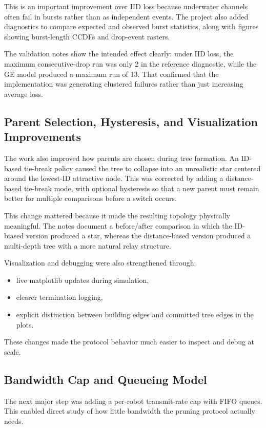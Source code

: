 \documentclass[11pt,a4paper]{article}
\begin{document}
This is an important improvement over IID loss because underwater channels often fail in bursts rather than as independent events. The project also added diagnostics to compare expected and observed burst statistics, along with figures showing burst-length CCDFs and drop-event rasters.

The validation notes show the intended effect clearly: under IID loss, the maximum consecutive-drop run was only 2 in the reference diagnostic, while the GE model produced a maximum run of 13. That confirmed that the implementation was generating clustered failures rather than just increasing average loss.

\subsection{Parent Selection, Hysteresis, and Visualization Improvements}

The work also improved how parents are chosen during tree formation. An ID-based tie-break policy caused the tree to collapse into an unrealistic star centered around the lowest-ID attractive node. This was corrected by adding a distance-based tie-break mode, with optional hysteresis so that a new parent must remain better for multiple comparisons before a switch occurs.

This change mattered because it made the resulting topology physically meaningful. The notes document a before/after comparison in which the ID-biased version produced a star, whereas the distance-based version produced a multi-depth tree with a more natural relay structure.

Visualization and debugging were also strengthened through:
\begin{itemize}
  \item live matplotlib updates during simulation,
  \item clearer termination logging,
  \item explicit distinction between building edges and committed tree edges in the plots.
\end{itemize}

These changes made the protocol behavior much easier to inspect and debug at scale.

\subsection{Bandwidth Cap and Queueing Model}

The next major step was adding a per-robot transmit-rate cap with FIFO queues. This enabled direct study of how little bandwidth the pruning protocol actually needs.
\end{document}
